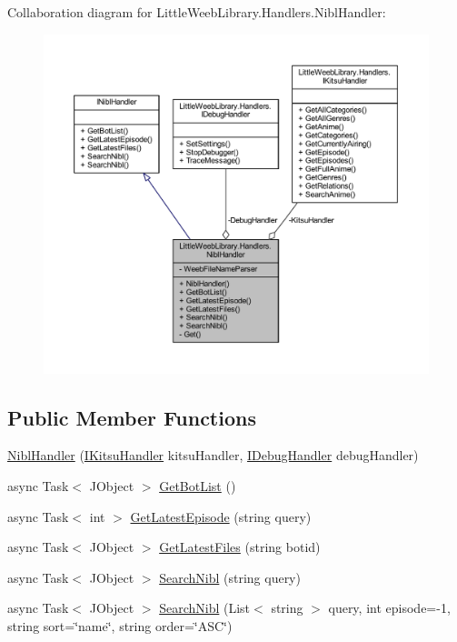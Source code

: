 Collaboration diagram for Little\+Weeb\+Library.\+Handlers.\+Nibl\+Handler\+:\nopagebreak
\begin{figure}[H]
\begin{center}
\leavevmode
\includegraphics[width=350pt]{class_little_weeb_library_1_1_handlers_1_1_nibl_handler__coll__graph}
\end{center}
\end{figure}
\subsection*{Public Member Functions}
\begin{DoxyCompactItemize}
\item 
\mbox{\hyperlink{class_little_weeb_library_1_1_handlers_1_1_nibl_handler_afdd2ee189bd6bec0a1fb4a309498e6c2}{Nibl\+Handler}} (\mbox{\hyperlink{interface_little_weeb_library_1_1_handlers_1_1_i_kitsu_handler}{I\+Kitsu\+Handler}} kitsu\+Handler, \mbox{\hyperlink{interface_little_weeb_library_1_1_handlers_1_1_i_debug_handler}{I\+Debug\+Handler}} debug\+Handler)
\item 
async Task$<$ J\+Object $>$ \mbox{\hyperlink{class_little_weeb_library_1_1_handlers_1_1_nibl_handler_aac05976a2e1a688dd187ccca513ab3cc}{Get\+Bot\+List}} ()
\item 
async Task$<$ int $>$ \mbox{\hyperlink{class_little_weeb_library_1_1_handlers_1_1_nibl_handler_a149bf3305de6348eaddee4afb92d5095}{Get\+Latest\+Episode}} (string query)
\item 
async Task$<$ J\+Object $>$ \mbox{\hyperlink{class_little_weeb_library_1_1_handlers_1_1_nibl_handler_a20fef31afe52976e394fc44659cc3593}{Get\+Latest\+Files}} (string botid)
\item 
async Task$<$ J\+Object $>$ \mbox{\hyperlink{class_little_weeb_library_1_1_handlers_1_1_nibl_handler_aa5fcae94d3322123b784078727a3db67}{Search\+Nibl}} (string query)
\item 
async Task$<$ J\+Object $>$ \mbox{\hyperlink{class_little_weeb_library_1_1_handlers_1_1_nibl_handler_acffe025c2b1158bc67196879622dfa0a}{Search\+Nibl}} (List$<$ string $>$ query, int episode=-\/1, string sort=\char`\"{}name\char`\"{}, string order=\char`\"{}A\+SC\char`\"{})
\end{DoxyCompactItemize}

